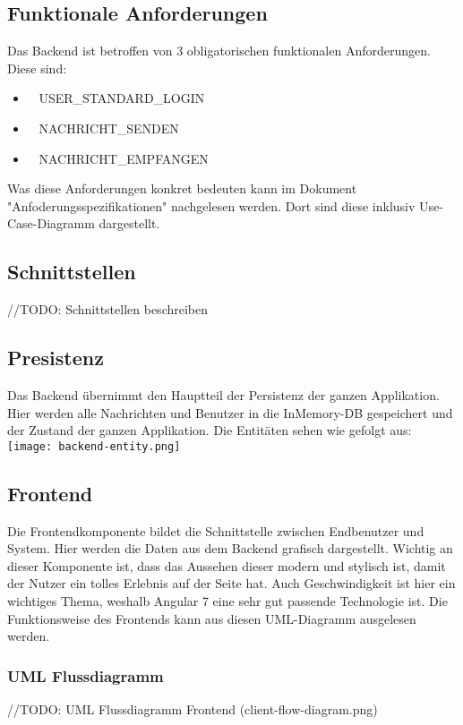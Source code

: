 	\subsection{Funktionale Anforderungen}
	Das Backend ist betroffen von 3 obligatorischen funktionalen Anforderungen. Diese sind:
	\begin{itemize}
		\item \faLock~ USER\_STANDARD\_LOGIN
		\item \faSend~ NACHRICHT\_SENDEN
		\item \faEnvelope~ NACHRICHT\_EMPFANGEN
	\end{itemize}
	Was diese Anforderungen konkret bedeuten kann im Dokument "Anfoderungsspezifikationen" nachgelesen werden. Dort sind diese inklusiv Use-Case-Diagramm dargestellt.

	\subsection{Schnittstellen}
	//TODO: Schnittstellen beschreiben

	\subsection{Presistenz}
	Das Backend übernimmt den Hauptteil der Persistenz der ganzen Applikation. Hier werden alle Nachrichten und Benutzer in die InMemory-DB gespeichert und der Zustand der ganzen Applikation.
	Die Entitäten sehen wie gefolgt aus:\newline
	\noindent
	\texttt{[image: backend-entity.png]}

	\subsection{Frontend}
	Die Frontendkomponente bildet die Schnittstelle zwischen Endbenutzer und System. Hier werden die Daten aus dem Backend grafisch dargestellt. Wichtig an dieser Komponente ist, dass das Aussehen dieser modern und stylisch ist, damit der Nutzer ein tolles Erlebnis auf der Seite hat. Auch Geschwindigkeit ist hier ein wichtiges Thema, weshalb Angular 7 eine sehr gut passende Technologie ist. Die Funktionsweise des Frontends kann aus diesen UML-Diagramm ausgelesen werden.
	\subsubsection{UML Flussdiagramm}
	//TODO: UML Flussdiagramm Frontend (client-flow-diagram.png)

